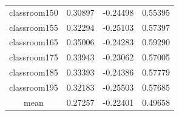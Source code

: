 \documentclass[cic,tc]{iiufrgs}
\begin{document}
\begin{table}[h]
\begin{tabular}{|c|c|c|c|}
          classroom150 & 0.30897 & -0.24498 & 0.55395 \\
          classroom155 & 0.32294 & -0.25103 & 0.57397 \\
          classroom165 & 0.35006 & -0.24283 & 0.59290 \\
          classroom175 & 0.33943 & -0.23062 & 0.57005 \\
          classroom185 & 0.33393 & -0.24386 & 0.57779 \\
          classroom195 & 0.32183 & -0.25503 & 0.57685 \\
          \hline
          \hline
          mean & 0.27257 & -0.22401 & 0.49658 \\
          \hline
        \end{tabular}
    \vspace{0.5em}
    \label{tbl:results1}
\end{table}
\end{document}
